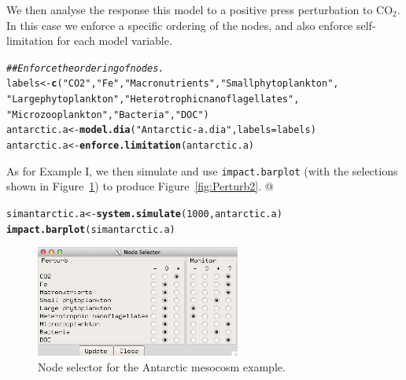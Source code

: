 \documentclass[a4paper]{article}\usepackage[]{graphicx}\usepackage[]{color}
\makeatletter
\newcommand{\hlnum}[1]{\textcolor[rgb]{0.686,0.059,0.569}{#1}}%
\newcommand{\hlstr}[1]{\textcolor[rgb]{0.192,0.494,0.8}{#1}}%
\newcommand{\hlcom}[1]{\textcolor[rgb]{0.678,0.584,0.686}{\textit{#1}}}%
\newcommand{\hlstd}[1]{\textcolor[rgb]{0.345,0.345,0.345}{#1}}%
\newcommand{\hlkwb}[1]{\textcolor[rgb]{0.69,0.353,0.396}{#1}}%
\newcommand{\hlkwc}[1]{\textcolor[rgb]{0.333,0.667,0.333}{#1}}%
\newcommand{\hlkwd}[1]{\textcolor[rgb]{0.737,0.353,0.396}{\textbf{#1}}}%
\newenvironment{kframe}{%
 \def\at@end@of@kframe{}%
 \ifinner\ifhmode%
  \def\at@end@of@kframe{\end{minipage}}%
  \begin{minipage}{\columnwidth}%
 \fi\fi%
 \def\FrameCommand##1{\hskip\@totalleftmargin \hskip-\fboxsep
 \colorbox{shadecolor}{##1}\hskip-\fboxsep
     \hskip-\linewidth \hskip-\@totalleftmargin \hskip\columnwidth}%
 \MakeFramed {\advance\hsize-\width
   \@totalleftmargin\z@ \linewidth\hsize
   \@setminipage}}%
 {\par\unskip\endMakeFramed%
 \at@end@of@kframe}
\newenvironment{knitrout}{}{} %
\makeatother
\begin{document}
We then analyse the response this model to a positive press perturbation to
$\mathrm{CO}_{2}$. In this case we enforce a specific ordering of the nodes, and also
enforce self-limitation for each model variable.
\begin{knitrout}
\color{fgcolor}\begin{kframe}
\begin{alltt}
\hlcom{## Enforce the ordering of nodes.}
\hlstd{labels} \hlkwb{<-} \hlkwd{c}\hlstd{(}\hlstr{"CO2"}\hlstd{,}\hlstr{"Fe"}\hlstd{,}\hlstr{"Macronutrients"}\hlstd{,}\hlstr{"Small phytoplankton"}\hlstd{,}
            \hlstr{"Large phytoplankton"}\hlstd{,}\hlstr{"Heterotrophic nanoflagellates"}\hlstd{,}
            \hlstr{"Microzooplankton"}\hlstd{,}\hlstr{"Bacteria"}\hlstd{,}\hlstr{"DOC"}\hlstd{)}
\hlstd{antarctic.a} \hlkwb{<-} \hlkwd{model.dia}\hlstd{(}\hlstr{"Antarctic-a.dia"}\hlstd{,}\hlkwc{labels}\hlstd{=labels)}
\hlstd{antarctic.a} \hlkwb{<-} \hlkwd{enforce.limitation}\hlstd{(antarctic.a)}
\end{alltt}
\end{kframe}
\end{knitrout}
As for Example I, we then simulate and use \texttt{impact.barplot} (with
the selections shown in Figure~\ref{fig:Selector2}) to produce
Figure~\ref{fig:Perturb2}.
@
\begin{knitrout}
\color{fgcolor}\begin{kframe}
\begin{alltt}
\hlstd{simantarctic.a} \hlkwb{<-} \hlkwd{system.simulate}\hlstd{(}\hlnum{1000}\hlstd{,antarctic.a)}
\hlkwd{impact.barplot}\hlstd{(simantarctic.a)}
\end{alltt}
\end{kframe}
\end{knitrout}

\begin{figure}[ht]
  \centering
  \includegraphics[width=0.6\textwidth]{Antarctic-selector.png}
  \caption{Node selector for the Antarctic mesocosm example.}
  \label{fig:Selector2}
\end{figure}
\end{document}
